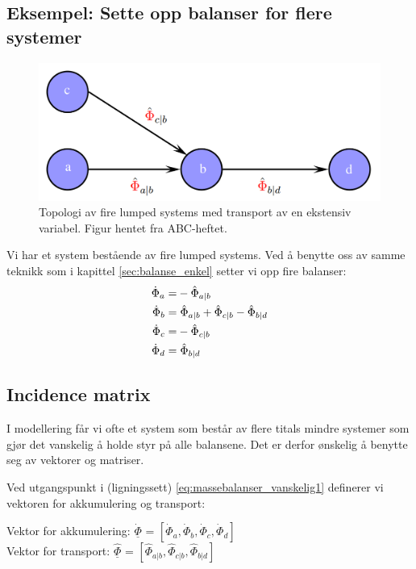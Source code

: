 \subsection{Eksempel: Sette opp balanser for flere systemer}\label{sec:flere_massebalanser}
\begin{figure}[H]
    \centering
    \includegraphics[scale=0.3]{Figures/massebalanser_flere_systemer}
    \caption{Topologi av fire lumped systems med transport av en ekstensiv variabel. Figur hentet fra ABC-heftet.}
    \label{fig:massebalanser_flersystem}
\end{figure}
Vi har et system bestående av fire lumped systems. Ved å benytte oss av samme teknikk som i kapittel \ref{sec:balanse_enkel} setter vi opp fire balanser: 
\begin{equation} 
    \begin{split}
    \label{eq:massebalanser_vanskelig1}
    \dot{\Phi}_{a} = & -\hat{\Phi}_{a|b} \\
    \dot{\Phi}_{b} = &\hspace{0.1cm} \hat{\Phi}_{a|b} + \hat{\Phi}_{c|b}-\hat{\Phi}_{b|d}\\
    \dot{\Phi}_{c} = & -\hat{\Phi}_{c|b}\\
    \dot{\Phi}_{d} = & \hspace{0.1cm}\hat{\Phi}_{b|d} \end{split}
\end{equation}


\subsection{Incidence matrix}
I modellering får vi ofte et system som består av flere titals mindre systemer som gjør det vanskelig å holde styr på alle balansene. Det er derfor ønskelig å benytte seg av vektorer og matriser. 

Ved utgangspunkt i (ligningssett) \ref{eq:massebalanser_vanskelig1} definerer vi vektoren for akkumulering og transport:\\ 
\begin{center}
    Vektor for akkumulering: $\underline{\dot{\Phi}}$ =
$[\dot{\Phi}_a,\dot{\Phi}_b,\dot{\Phi}_c,\dot{\Phi}_d]$ \\
Vektor for transport:  $\underline{\hat{\Phi}}$ =
$[\hat{\Phi}_{a|b},\hat{\Phi}_{c|b},\hat{\Phi}_{b|d}]$
    
\end{center}

